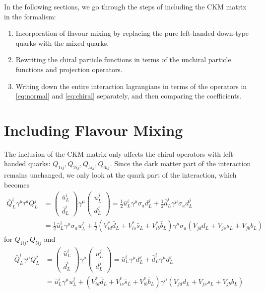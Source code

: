 In the following sections, we go through the steps of including the CKM matrix in the formalism:
\begin{enumerate}
	\item Incorporation of flavour mixing by replacing the pure left-handed down-type quarks with the mixed quarks.
	\item Rewriting the chiral particle functions in terms of the unchiral particle functions and projection operators.
	\item Writing down the entire interaction lagrangians in terms of the operators in \eqref{eq:normal} and \eqref{eq:chiral} separately, and then comparing the coefficients.
\end{enumerate}

\section{Including Flavour Mixing}
The inclusion of the CKM matrix only affects the chiral operators with left-handed quarks: $Q_{1ij},Q_{2ij},Q_{5ij},Q_{6ij}$. Since the dark matter part of the interaction remains unchanged, we only look at the quark part of the interaction, which becomes
\begin{align*}
	\bar{Q}_L^i\gamma^\mu\tau^a Q_L^j &=  \begin{pmatrix}
	\bar{u}_L^i \\ \bar{d}_L^i
	\end{pmatrix}
	\gamma^\mu \begin{pmatrix}
	u_L^j \\ d_L^j
	\end{pmatrix}
	= \frac{1}{2}\bar{u}_L^i\gamma^\mu \sigma_a d_L^j + \frac{1}{2}\bar{d}_L^i\gamma^\mu\sigma_a d_L^j \\
	&= \frac{1}{2}\bar{u}_L^i\gamma^\mu \sigma_a u_L^j + \frac{1}{2}(V_{id}^*\bar{d}_L + V_{is}^*\bar{s}_L+V_{ib}^*\bar{b}_L)\gamma^\mu\sigma_a(V_{jd}d_L+V_{js}s_L+V_{jb}b_L)
\end{align*}
for $Q_{1ij}, Q_{5ij}$ and
\begin{align*}
	\bar{Q}_L^i\gamma^\mu Q_L^j &= \begin{pmatrix}
	\bar{u}_L^i \\ \bar{d}_L^i
	\end{pmatrix}
	\gamma^\mu \begin{pmatrix}
	u_L^j \\ d_L^j
	\end{pmatrix}
	= \bar{u}_L^i\gamma^\mu d_L^j + \bar{d}_L^i\gamma^\mu d_L^j \\
	&= \bar{u}_L^i\gamma^\mu u_L^j + (V_{id}^*\bar{d}_L + V_{is}^*\bar{s}_L+V_{ib}^*\bar{b}_L)\gamma^\mu(V_{jd}d_L+V_{js}s_L+V_{jb}b_L)
\end{align*}
